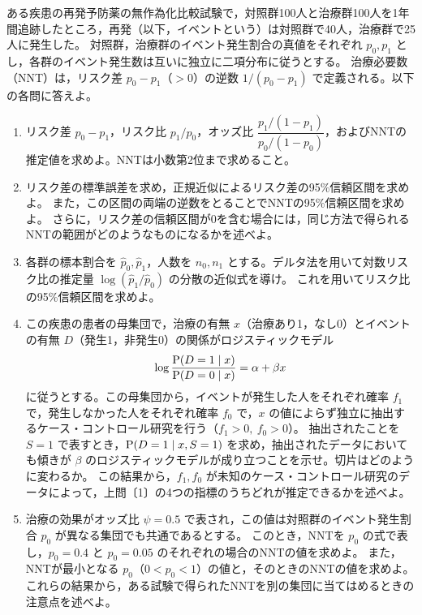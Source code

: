 \documentclass[a4paper,10pt]{ltjsarticle}
\begin{document}
ある疾患の再発予防薬の無作為化比較試験で，対照群100人と治療群100人を1年間追跡したところ，再発（以下，イベントという）は対照群で40人，治療群で25人に発生した。
対照群，治療群のイベント発生割合の真値をそれぞれ $p_0,p_1$ とし，各群のイベント発生数は互いに独立に二項分布に従うとする。
治療必要数（NNT）は，リスク差 $p_0-p_1$（$>0$）の逆数 $1/(p_0-p_1)$ で定義される。以下の各問に答えよ。
\begin{enumerate}
\item リスク差 $p_0-p_1$，リスク比 $p_1/p_0$，オッズ比 $\dfrac{p_1/(1-p_1)}{p_0/(1-p_0)}$，およびNNTの推定値を求めよ。NNTは小数第2位まで求めること。
\item リスク差の標準誤差を求め，正規近似によるリスク差の95\%信頼区間を求めよ。
また，この区間の両端の逆数をとることでNNTの95\%信頼区間を求めよ。
さらに，リスク差の信頼区間が0を含む場合には，同じ方法で得られるNNTの範囲がどのようなものになるかを述べよ。
\item 各群の標本割合を $\hat p_0,\hat p_1$，人数を $n_0,n_1$ とする。デルタ法を用いて対数リスク比の推定量 $\log(\hat p_1/\hat p_0)$ の分散の近似式を導け。
これを用いてリスク比の95\%信頼区間を求めよ。
\item この疾患の患者の母集団で，治療の有無 $x$（治療あり1，なし0）とイベントの有無 $D$（発生1，非発生0）の関係がロジスティックモデル
\[
\log\frac{\operatorname{P}(D=1\mid x)}{\operatorname{P}(D=0\mid x)}=\alpha+\beta x
\]
に従うとする。この母集団から，イベントが発生した人をそれぞれ確率 $f_1$ で，発生しなかった人をそれぞれ確率 $f_0$ で，$x$ の値によらず独立に抽出するケース・コントロール研究を行う（$f_1>0,\ f_0>0$）。
抽出されたことを $S=1$ で表すとき，$\operatorname{P}(D=1\mid x,S=1)$ を求め，抽出されたデータにおいても傾きが $\beta$ のロジスティックモデルが成り立つことを示せ。切片はどのように変わるか。
この結果から，$f_1,f_0$ が未知のケース・コントロール研究のデータによって，上問〔1〕の4つの指標のうちどれが推定できるかを述べよ。
\item 治療の効果がオッズ比 $\psi=0.5$ で表され，この値は対照群のイベント発生割合 $p_0$ が異なる集団でも共通であるとする。
このとき，NNTを $p_0$ の式で表し，$p_0=0.4$ と $p_0=0.05$ のそれぞれの場合のNNTの値を求めよ。
また，NNTが最小となる $p_0$（$0<p_0<1$）の値と，そのときのNNTの値を求めよ。
これらの結果から，ある試験で得られたNNTを別の集団に当てはめるときの注意点を述べよ。
\end{enumerate}
\newpage
\end{document}
